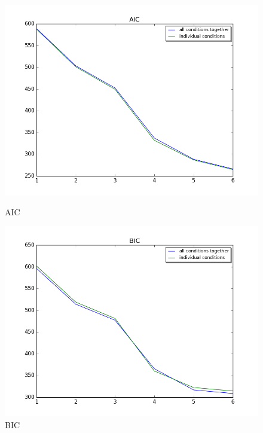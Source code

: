 %



\begin{figure}
\centering
	\begin{minipage}[b]{0.33\linewidth}
		\centering
		\includegraphics[width=.8\linewidth]{../images/aic_better}  

		\caption{AIC}
		\label{fig:AIC}

	\end{minipage}
	\quad
	\begin{minipage}[b]{0.33\linewidth}
		\centering
		\includegraphics[width=.8\linewidth]{../images/bic_better}  
		\caption{BIC}
		\label{fig:BIC}


\end{minipage}
\end{figure}
